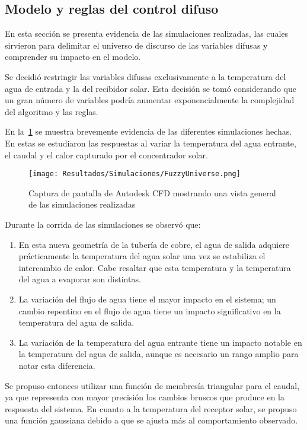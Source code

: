 		\subsection{Modelo y reglas del control difuso}
				
			En esta sección se presenta evidencia de las simulaciones realizadas, las cuales sirvieron para delimitar el universo de discurso de las variables difusas y comprender su impacto en el modelo.
				
			Se decidió restringir las variables difusas exclusivamente a la temperatura del agua de entrada y la del recibidor solar. Esta decisión se tomó considerando que un gran número de variables podría aumentar exponencialmente la complejidad del algoritmo y las reglas.
			
			En la~\cref{fig:FuzzyUniverse} se muestra brevemente evidencia de las diferentes simulaciones hechas. En estas se estudiaron las respuestas al variar la temperatura del agua entrante, el caudal y el calor capturado por el concentrador solar.
								
			\begin{figure}[H]
				\centering
				\texttt{[image: Resultados/Simulaciones/FuzzyUniverse.png]}
				\caption{Captura de pantalla de Autodesk CFD mostrando una vista general de las simulaciones realizadas}
				\label{fig:FuzzyUniverse}
			\end{figure}
			
			Durante la corrida de las simulaciones se observó que:
			
			\begin{enumerate}
				\item En esta nueva geometría de la tubería de cobre, el agua de salida adquiere prácticamente la temperatura del agua solar una vez se estabiliza el intercambio de calor. Cabe resaltar que esta temperatura y la temperatura del agua a evaporar son distintas.
				\item La variación del flujo de agua tiene el mayor impacto en el sistema; un cambio repentino en el flujo de agua tiene un impacto significativo en la temperatura del agua de salida.
				\item La variación de la temperatura del agua entrante tiene un impacto notable en la temperatura del agua de salida, aunque es necesario un rango amplio para notar esta diferencia.
			\end{enumerate} 
						
			Se propuso entonces utilizar una función de membresía triangular para el caudal, ya que representa con mayor precisión los cambios bruscos que produce en la respuesta del sistema. En cuanto a la temperatura del receptor solar, se propuso una función gaussiana debido a que se ajusta más al comportamiento observado.
			
